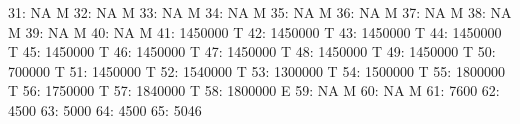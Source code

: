 \documentclass[nojss]{jss}
\begin{document}
\begin{Schunk}
\begin{Soutput}
 31:                         NA                                          M
 32:                         NA                                          M
 33:                         NA                                          M
 34:                         NA                                          M
 35:                         NA                                          M
 36:                         NA                                          M
 37:                         NA                                          M
 38:                         NA                                          M
 39:                         NA                                          M
 40:                         NA                                          M
 41:                    1450000                                          T
 42:                    1450000                                          T
 43:                    1450000                                          T
 44:                    1450000                                          T
 45:                    1450000                                          T
 46:                    1450000                                          T
 47:                    1450000                                          T
 48:                    1450000                                          T
 49:                    1450000                                          T
 50:                     700000                                          T
 51:                    1450000                                          T
 52:                    1540000                                          T
 53:                    1300000                                          T
 54:                    1500000                                          T
 55:                    1800000                                          T
 56:                    1750000                                          T
 57:                    1840000                                          T
 58:                    1800000                                          E
 59:                         NA                                          M
 60:                         NA                                          M
 61:                       7600                                           
 62:                       4500                                           
 63:                       5000                                           
 64:                       4500                                           
 65:                       5046                                           

\end{Soutput}
\end{Schunk}
\end{document}

